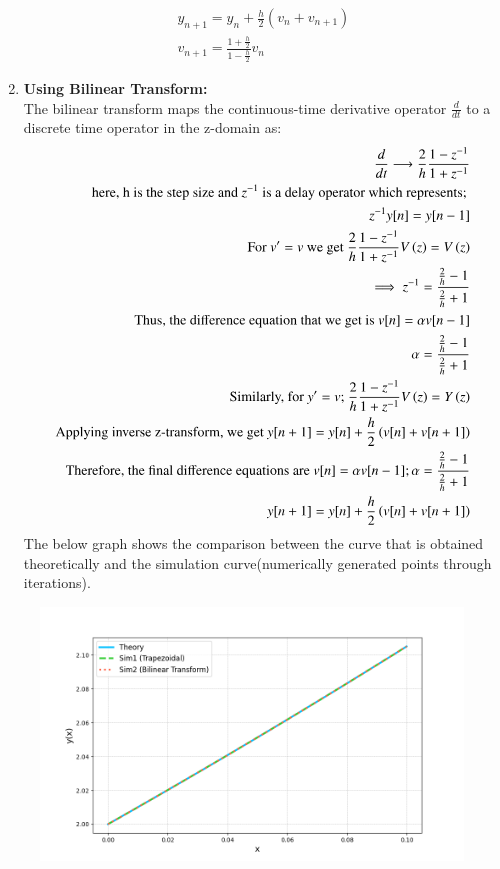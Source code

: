 \documentclass[journal]{IEEEtran}
\begin{document}
\begin{enumerate}
\begin{align}
        y_{n+1} = y_{n} + \frac{h}{2} \left( v_{n} + v_{n+1} \right)\\
        v_{n+1}=\frac{1+\frac{h}{2}}{1-\frac{h}{2}}v_n
   \end{align}
   \item \textbf{Using Bilinear Transform:}\\
   The bilinear transform maps the continuous-time derivative operator $\frac{d}{dt}$ to a discrete time operator in the z-domain as:
   \begin{align}
       \frac{d}{dt}\longrightarrow\frac{2}{h}\frac{1-z^{-1}}{1+z^{-1}}\\
       \text{here, h is the step size and $z^{-1}$ is a delay operator which represents; }\\
       z^{-1}y[n]=y[n-1]\\
       \text{For $v^\prime=v$ we get }\frac{2}{h}\frac{1-z^{-1}}{1+z^{-1}}V\left(z\right)=V\left(z\right)\\
       \implies z^{-1}=\frac{\frac{2}{h}-1}{\frac{2}{h}+1}\\
       \text{Thus, the difference equation that we get is }v[n]=\alpha v[n-1]\\
       \alpha = \frac{\frac{2}{h}-1}{\frac{2}{h}+1}\\
       \text{Similarly, for $y^\prime=v$; }\frac{2}{h}\frac{1-z^{-1}}{1+z^{-1}}V\left(z\right)=Y\left(z\right)\\
       \text{Applying inverse z-transform, we get }y[n+1] = y[n] + \frac{h}{2} \left( v[n] + v[n+1] \right)\\
      \text{Therefore, the final difference equations are }v[n]=\alpha v[n-1]; \alpha = \frac{\frac{2}{h}-1}{\frac{2}{h}+1}\\
       y[n+1] = y[n] + \frac{h}{2} \left( v[n] + v[n+1] \right)
   \end{align}
    The below graph shows the comparison between the curve that is obtained theoretically and the simulation curve(numerically generated points through iterations).
\end{enumerate}
\begin{figure}[htbp]
  \centering
  \includegraphics[width=\columnwidth]{figs/curve.png}
\end{figure}
\end{document}
